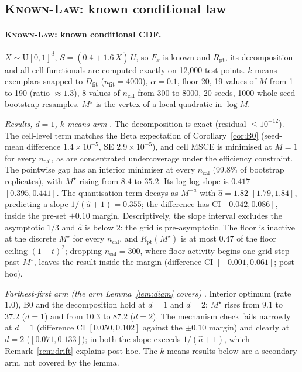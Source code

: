 \documentclass[11pt]{article}
\theoremstyle{definition}
\theoremstyle{remark}
\newcommand{\Dfit}{D_{\mathrm{fit}}}
\newcommand{\1}{\mathbf{1}}
\newcommand{\expname}[1]{\textsc{#1}}
\begin{document}
\subsection{\expname{Known-Law}: known conditional law}
\label{app:x1}
\paragraph{\expname{Known-Law}: known conditional CDF.}
$X\sim\mathrm{U}[0,1]^d$, $S=(0.4+1.6\,\bar X)\,U$, so $F_x$ is known and $R_{\mathrm{pt}}$,
its decomposition and all cell functionals are computed exactly on 12{,}000 test points.
$k$-means exemplars snapped to $\Dfit$ ($n_{\mathrm{fit}}=4000$), $\alpha=0.1$, floor 20,
19 values of $M$ from 1 to 190 (ratio $\approx1.3$), 8 values of $n_{\mathrm{cal}}$ from 300 to
8000, 20 seeds, 1000 whole-seed bootstrap resamples. $M^\star$ is the vertex of a local
quadratic in $\log M$.

\emph{Results, $d=1$, $k$-means arm} . The decomposition is exact (residual $\le10^{-12}$). The
cell-level term matches the Beta expectation of Corollary~\ref{cor:B0} (seed-mean
difference $1.4\times10^{-5}$, SE $2.9\times10^{-5}$), and cell MSCE is minimised at $M=1$ for
every $n_{\mathrm{cal}}$, as are concentrated undercoverage under the efficiency constraint.
The pointwise gap has an interior minimiser at every $n_{\mathrm{cal}}$ (99.8\% of bootstrap
replicates), with $M^\star$ rising from $8.4$ to $35.2$. Its log-log slope is $0.417$
$[0.395,0.441]$. The quantisation term decays as $M^{-\hat a}$ with $\hat a=1.82$
$[1.79,1.84]$, predicting a slope $1/(\hat a+1)=0.355$; the difference has CI
$[0.042,0.086]$, inside the pre-set $\pm0.10$ margin.
Descriptively, the slope interval excludes the asymptotic $1/3$ and $\hat a$ is below $2$: the
grid is pre-asymptotic. The floor is inactive at the discrete $M^\star$ for every
$n_{\mathrm{cal}}$, and $R_{\mathrm{pt}}(M^\star)$ is at most $0.47$ of the floor ceiling
$(1-t)^2$; dropping $n_{\mathrm{cal}}=300$, where floor activity begins one grid step past
$M^\star$, leaves the result inside the margin (difference CI $[-0.001,0.061]$; post hoc).

\emph{Farthest-first arm (the arm Lemma~\ref{lem:diam} covers)} . Interior optimum (rate
$1.0$), B0 and the decomposition hold at $d=1$ and $d=2$; $M^\star$ rises from $9.1$ to $37.2$
($d=1$) and from $10.3$ to $87.2$ ($d=2$). The mechanism check fails narrowly at $d=1$ (difference
CI $[0.050,0.102]$ against the $\pm0.10$ margin) and clearly at $d=2$ ($[0.071,0.133]$); in both
the slope exceeds $1/(\hat a+1)$, which Remark~\ref{rem:drift} explains post hoc. The $k$-means results
below are a secondary arm, not covered by the lemma.
\end{document}
